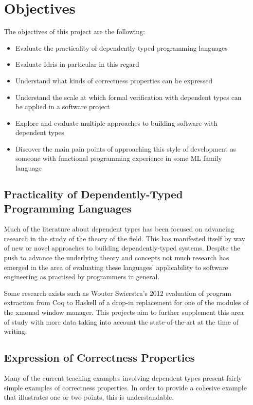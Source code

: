 \documentclass[a4paper, notitlepage]{report}
\begin{document}
\section{Objectives}
\label{sec:org5fd57b7}
The objectives of this project are the following:
\begin{itemize}
\item Evaluate the practicality of dependently-typed programming languages
\item Evaluate Idris in particular in this regard
\item Understand what kinds of correctness properties can be expressed
\item Understand the scale at which formal verification with dependent types can be
applied in a software project
\item Explore and evaluate multiple approaches to building software with dependent
types
\item Discover the main pain points of approaching this style of development as
someone with functional programming experience in some ML family language
\end{itemize}

\subsection{Practicality of Dependently-Typed Programming Languages}
\label{sec:orgb3f2cb6}
Much of the literature about dependent types has been focused on advancing
research in the study of the theory of the field. This has manifested itself by
way of new or novel approaches to building dependently-typed systems. Despite
the push to advance the underlying theory and concepts not much research has
emerged in the area of evaluating these languages' applicability to software
engineering as practised by programmers in general.

Some research exists such as Wouter Swierstra's 2012 evaluation
\cite{swierstra_xmonad_2012} of program extraction from Coq to Haskell of a
drop-in replacement for one of the modules of the xmonad window manager. This
projects aim to further supplement this area of study with more data taking into
account the state-of-the-art at the time of writing.

\subsection{Expression of Correctness Properties}
\label{sec:org873fa28}
Many of the current teaching examples involving dependent types present fairly
simple examples of correctness properties. In order to provide a cohesive
example that illustrates one or two points, this is understandable.
\end{document}
